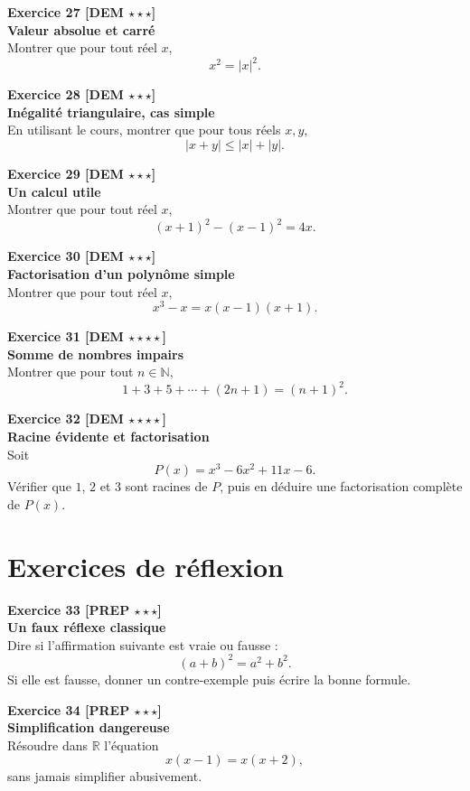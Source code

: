 \documentclass[11pt,a4paper]{article}
\begin{document}
\textbf{Exercice 27 [DEM $\star\star\star$]}\\
\textbf{Valeur absolue et carré}\\
Montrer que pour tout réel $x$,
\[
x^2=|x|^2.
\]

\textbf{Exercice 28 [DEM $\star\star\star$]}\\
\textbf{Inégalité triangulaire, cas simple}\\
En utilisant le cours, montrer que pour tous réels $x,y$,
\[
|x+y|\leq |x|+|y|.
\]

\textbf{Exercice 29 [DEM $\star\star\star$]}\\
\textbf{Un calcul utile}\\
Montrer que pour tout réel $x$,
\[
(x+1)^2-(x-1)^2=4x.
\]

\textbf{Exercice 30 [DEM $\star\star\star$]}\\
\textbf{Factorisation d’un polynôme simple}\\
Montrer que pour tout réel $x$,
\[
x^3-x=x(x-1)(x+1).
\]

\textbf{Exercice 31 [DEM $\star\star\star\star$]}\\
\textbf{Somme de nombres impairs}\\
Montrer que pour tout $n\in\mathbb{N}$,
\[
1+3+5+\cdots+(2n+1)=(n+1)^2.
\]

\textbf{Exercice 32 [DEM $\star\star\star\star$]}\\
\textbf{Racine évidente et factorisation}\\
Soit
\[
P(x)=x^3-6x^2+11x-6.
\]
Vérifier que $1$, $2$ et $3$ sont racines de $P$, puis en déduire une factorisation complète de $P(x)$.

\newpage

\section*{Exercices de réflexion}

\textbf{Exercice 33 [PREP $\star\star\star$]}\\
\textbf{Un faux réflexe classique}\\
Dire si l’affirmation suivante est vraie ou fausse :
\[
(a+b)^2=a^2+b^2.
\]
Si elle est fausse, donner un contre-exemple puis écrire la bonne formule.

\textbf{Exercice 34 [PREP $\star\star\star$]}\\
\textbf{Simplification dangereuse}\\
Résoudre dans $\mathbb{R}$ l’équation
\[
x(x-1)=x(x+2),
\]
sans jamais simplifier abusivement.
\end{document}
